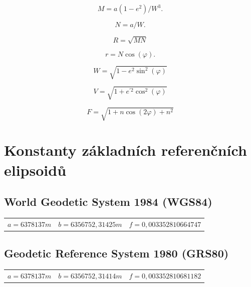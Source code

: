 \begin{equation}
M = a\left(1-e^{2}\right) / W^{3}.
\end{equation}

\begin{equation}
N = a/W.
\end{equation}

\begin{equation}
R = \sqrt{M N}
\end{equation}

\begin{equation}
r = N\cos{\left(\varphi\right)}.
\end{equation}

\begin{equation}
W = \sqrt{1-e^{2}\sin^{2}{\left(\varphi\right)}}
\end{equation}

\begin{equation}
V = \sqrt{1+e^{'2}\cos^{2}{\left(\varphi\right)}}
\end{equation}

\begin{equation}
F = \sqrt{1+n\cos{\left(2\varphi\right)}+n^{2}}
\end{equation}

\section{Konstanty základních referenčních elipsoidů} \label{appRefEllConst}

\subsection{World Geodetic System 1984 (WGS84)}\label{appRefEllConstWGS84}
\begin{table}[ht!]
\begin{tabular}{c c c}
$a = 6 378 137 m$ & $b = 6 356 752,31425 m$ & $f = 0,00335 28106 64747$ \\
\end{tabular}
\end{table}

\subsection{Geodetic Reference System 1980 (GRS80)}
\begin{table}[ht!]
\begin{tabular}{c c c}
$a = 6 378 137 m$ & $b = 6 356 752,31414 m$ & $f = 0,00335 28106 81182$ \\
\end{tabular}
\end{table}

